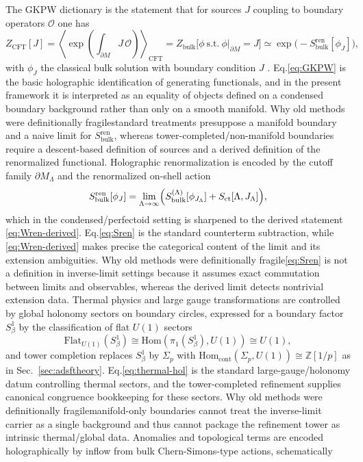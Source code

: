 \documentclass[11pt]{article}
\theoremstyle{remark}
\newcommand{\Z}{\mathbb{Z}}
\begin{document}
The GKPW dictionary is the statement that for sources \(J\) coupling to boundary operators \(\mathcal{O}\) one has
\begin{equation}\label{eq:GKPW}
Z_{\mathrm{CFT}}[J]=\left\langle \exp\!\left(\int_{\partial M} J\,\mathcal{O}\right)\right\rangle_{\mathrm{CFT}}=Z_{\mathrm{bulk}}\bigl[\phi\ \text{s.t.}\ \phi|_{\partial M}=J\bigr]\simeq \exp\!\bigl(-S_{\mathrm{bulk}}^{\mathrm{ren}}[\phi_{J}]\bigr),
\end{equation}
with \(\phi_{J}\) the classical bulk solution with boundary condition \(J\) \cite{Witten1995}. Eq.\eqref{eq:GKPW} is the basic holographic identification of generating functionals, and in the present framework it is interpreted as an equality of objects defined on a condensed boundary background rather than only on a smooth manifold. Why old methods were definitionally fragile\:standard treatments presuppose a manifold boundary and a naive limit for \(S_{\mathrm{bulk}}^{\mathrm{ren}}\), whereas tower-completed/non-manifold boundaries require a descent-based definition of sources and a derived definition of the renormalized functional. Holographic renormalization is encoded by the cutoff family \(\partial M_{\Lambda}\) and the renormalized on-shell action
\begin{equation}\label{eq:Sren}
S_{\mathrm{bulk}}^{\mathrm{ren}}[\phi_{J}]=\lim_{\Lambda\to\infty}\Bigl(S_{\mathrm{bulk}}^{(\Lambda)}[\phi_{J_{\Lambda}}]+S_{\mathrm{ct}}[\Lambda,J_{\Lambda}]\Bigr),
\end{equation}
which in the condensed/perfectoid setting is sharpened to the derived statement \eqref{eq:Wren-derived}. Eq.\eqref{eq:Sren} is the standard counterterm subtraction, while \eqref{eq:Wren-derived} makes precise the categorical content of the limit and its extension ambiguities. Why old methods were definitionally fragile\:\eqref{eq:Sren} is not a definition in inverse-limit settings because it assumes exact commutation between limits and observables, whereas the derived limit detects nontrivial extension data. Thermal physics and large gauge transformations are controlled by global holonomy sectors on boundary circles, expressed for a boundary factor \(S^{1}_{\beta}\) by the classification of flat \(U(1)\) sectors
\begin{equation}\label{eq:thermal-hol}
\mathrm{Flat}_{U(1)}(S^{1}_{\beta})\cong \mathrm{Hom}(\pi_{1}(S^{1}_{\beta}),U(1))\cong U(1),
\end{equation}
and tower completion replaces \(S^{1}_{\beta}\) by \(\Sigma_{p}\) with \(\mathrm{Hom}_{\mathrm{cont}}(\Sigma_{p},U(1))\cong \Z[1/p]\) as in Sec.~\ref{sec:adsftheory}. Eq.\eqref{eq:thermal-hol} is the standard large-gauge/holonomy datum controlling thermal sectors, and the tower-completed refinement supplies canonical congruence bookkeeping for these sectors. Why old methods were definitionally fragile\:manifold-only boundaries cannot treat the inverse-limit carrier as a single background and thus cannot package the refinement tower as intrinsic thermal/global data. Anomalies and topological terms are encoded holographically by inflow from bulk Chern-Simons-type actions, schematically
\end{document}
